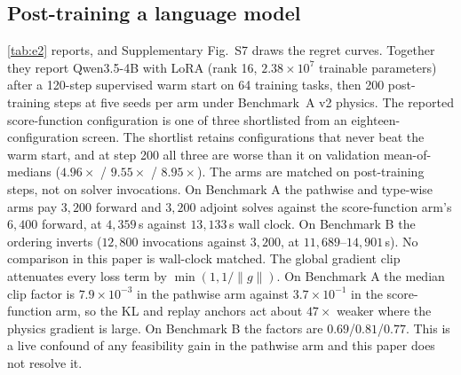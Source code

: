 \documentclass[journal]{IEEEtran}
\begin{document}
\subsection{Post-training a language model}
\label{sec:e2}
\cref{tab:e2} reports, and Supplementary Fig.~S7 draws the regret curves. Together they report Qwen3.5-4B with LoRA (rank 16,
$2.38\times10^{7}$ trainable parameters) after a 120-step supervised warm start
on 64 training tasks, then 200 post-training steps at five seeds per arm under
Benchmark~A v2 physics.  The reported score-function configuration is one of
three shortlisted from an eighteen-configuration screen.  The shortlist retains
configurations that never beat the warm start, and at step 200 all three are
worse than it on validation mean-of-medians ($4.96\times$ / $9.55\times$ /
$8.95\times$).  The arms are matched on post-training steps,
not on solver invocations.
On Benchmark A the pathwise and type-wise arms pay
$3{,}200$ forward and $3{,}200$ adjoint solves against the score-function arm's
$6{,}400$ forward, at $4{,}359$\,s against $13{,}133$\,s wall clock. On
Benchmark B the ordering inverts ($12{,}800$ invocations against $3{,}200$, at
$11{,}689$--$14{,}901$\,s).  No comparison in this paper is wall-clock matched.
The global gradient clip attenuates every loss term by $\min(1,1/\|g\|)$. On Benchmark A the median clip factor is $7.9\times10^{-3}$ in the pathwise arm
against $3.7\times10^{-1}$ in the score-function arm, so the KL and replay
anchors act about $47\times$ weaker where the physics gradient is large.  On
Benchmark B the factors are $0.69$/$0.81$/$0.77$.  This is a live confound of any
feasibility gain in the pathwise arm and this paper does not resolve it.
\end{document}
